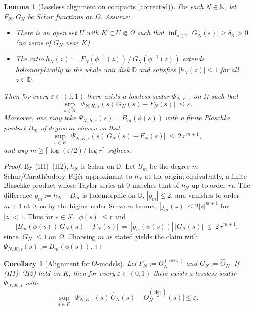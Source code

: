 \documentclass[11pt]{article}
\newtheorem{lemma}[theorem]{Lemma}
\newtheorem{corollary}[theorem]{Corollary}
\theoremstyle{definition}
\theoremstyle{remark}
\newcommand{\N}{\mathbb{N}}
\begin{document}
\begin{lemma}[Lossless alignment on compacts (corrected)]\label{lem:alignment-corrected}
For each \(N\in\N\), let \(F_N,G_N\) be Schur functions on \(\Omega\). Assume:
\begin{itemize}
  \item[(H1)] There is an open set \(U\) with \(K\subset U\Subset\Omega\) such that \(\inf_{s\in U}|G_N(s)|\ge \delta_K>0\) (no zeros of \(G_N\) near \(K\)).
  \item[(H2)] The ratio \(h_N(z):=F_N(\phi^{-1}(z))\,/\,G_N(\phi^{-1}(z))\) extends holomorphically to the whole unit disk \(\mathbb D\) and satisfies \(|h_N(z)|\le 1\) for all \(z\in\mathbb D\).
\end{itemize}
Then for every \(\varepsilon\in(0,1)\) there exists a lossless scalar \(\Psi_{N,K,\varepsilon}\) on \(\Omega\) such that
\[
  \sup_{s\in K}\,\bigl|\Psi_{N,K,\varepsilon}(s)\,G_N(s)-F_N(s)\bigr|\ \le\ \varepsilon.
\]
Moreover, one may take \(\Psi_{N,K,\varepsilon}(s)=B_m(\phi(s))\) with a finite Blaschke product \(B_m\) of degree \(m\) chosen so that
\[
  \sup_{s\in K}\,\bigl|\Psi_{N,K,\varepsilon}(s)\,G_N(s)-F_N(s)\bigr|\ \le\ 2\,r^{\,m+1},
\]
and any \(m\ge \bigl\lceil {\log(\varepsilon/2)}/{\log r}\bigr\rceil\) suffices.
\end{lemma}
\begin{proof}
By (H1)–(H2), \(h_N\) is Schur on \(\mathbb D\). Let \(B_m\) be the degree-\(m\) Schur/Carath\'eodory–Fej\'er approximant to \(h_N\) at the origin; equivalently, a finite Blaschke product whose Taylor series at 0 matches that of \(h_N\) up to order \(m\). The difference \(g_m:=h_N-B_m\) is holomorphic on \(\mathbb D\), \(|g_m|\le 2\), and vanishes to order \(m{+}1\) at 0, so by the higher-order Schwarz lemma, \(|g_m(z)|\le 2|z|^{m+1}\) for \(|z|<1\). Thus for \(s\in K\), \(|\phi(s)|\le r\) and
\[
  \bigl|B_m(\phi(s))\,G_N(s)-F_N(s)\bigr|\ =\ |g_m(\phi(s))|\,|G_N(s)|\ \le\ 2\,r^{m+1},
\]
since \(|G_N|\le 1\) on \(\Omega\). Choosing \(m\) as stated yields the claim with \(\Psi_{N,K,\varepsilon}(s):=B_m(\phi(s))\).
\end{proof}

\begin{corollary}[Alignment for \(\Theta\)-models]\label{cor:ThetaAlignment-corrected}
Let \(F_N:=\Theta^{(\operatorname{det}_2)}_N\) and \(G_N:=\widehat{\Theta}_N\). If \emph{(H1)}–\emph{(H2)} hold on \(K\), then for every \(\varepsilon\in(0,1)\) there exists a lossless scalar \(\Psi_{N,K,\varepsilon}\) with
\[
  \sup_{s\in K}\, \bigl| \Psi_{N,K,\varepsilon}(s)\,\widehat{\Theta}_N(s)-\Theta^{(\operatorname{det}_2)}_N(s) \bigr| \le \varepsilon.
\]
\end{corollary}
\end{document}
